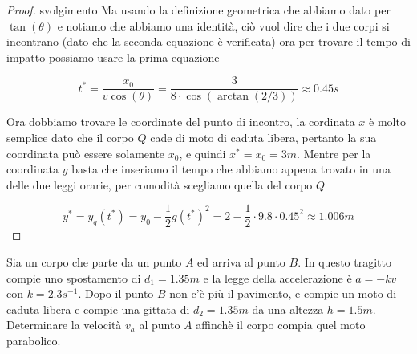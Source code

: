 \documentclass{rapport}
\begin{document}
\begin{proof}{svolgimento}
Ma usando la definizione geometrica che abbiamo dato per $\tan(\theta)$ e notiamo che abbiamo una identità, ciò vuol dire che i due corpi si incontrano (dato che la seconda equazione è verificata) ora per trovare il tempo di impatto possiamo usare la prima equazione

\[
t^* = \dfrac{x_0}{v\cos(\theta)} = \dfrac{3}{8 \cdot \cos(\arctan(2/3))} \approx 0.45s
\]

Ora dobbiamo trovare le coordinate del punto di incontro, la cordinata $x$ è molto semplice dato che il corpo $Q$ cade di moto di caduta libera, pertanto la sua coordinata può essere solamente $x_0$, e quindi $x^* = x_0 = 3m$. Mentre per la coordinata $y$ basta che inseriamo il tempo  che abbiamo appena trovato in una delle due leggi orarie, per comodità scegliamo quella del corpo $Q$ 

\[
y^*= y_q(t^*) = y_0 - \dfrac{1}{2}g(t^*)^2 = 2 - \dfrac{1}{2}\cdot 9.8 \cdot 0.45^2 \approx 1.006m
\]


  \end{proof}

\begin{esercizio}{}{}
  Sia un corpo che parte da un punto $A$ ed arriva al punto $B$. In questo tragitto compie uno spostamento di $d_1 = 1.35m$ e la legge della accelerazione è $a=-kv$ con $k=2.3s^{-1}$. Dopo il punto $B$ non c'è più il pavimento, e compie un moto di caduta libera e compie una gittata di $d_2=1.35m$ da una altezza $h=1.5m$. Determinare la velocità $v_a$ al punto $A$ affinchè  il corpo compia quel moto parabolico. 
\end{esercizio}
\end{document}
